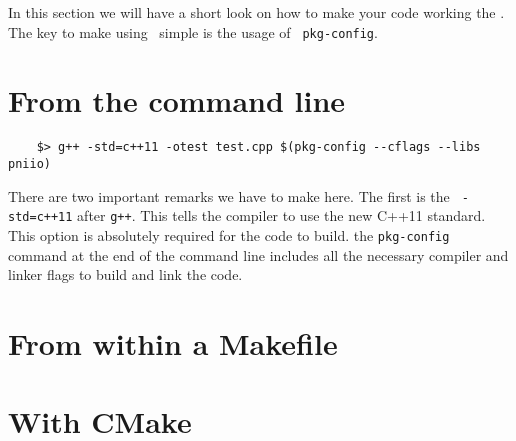 
In this section we will have a short look on how to make your code working the
\libpniio. The key to make using \libpniio\ simple is the usage of {\tt
pkg-config}. 

\section{From the command line}

\begin{verbatim}
    $> g++ -std=c++11 -otest test.cpp $(pkg-config --cflags --libs pniio)
\end{verbatim}
There are two important remarks we have to make here. The first is the {\tt
-std=c++11} after {\tt g++}. This tells the compiler to use the new C++11
standard. This option is absolutely required for the code to build. 
the {\tt pkg-config} command at the end of the command line includes all the
necessary compiler and linker flags to build and link the code.

\section{From within a Makefile}

\section{With CMake}
